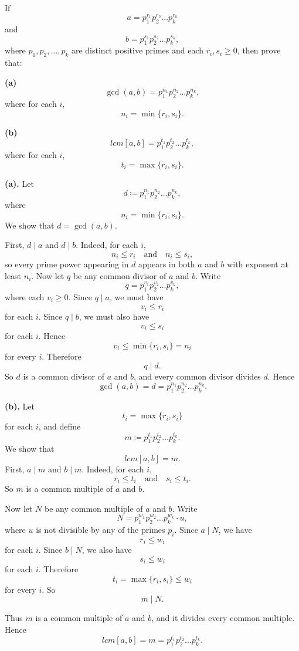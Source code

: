 \begin{problem}{
    If
    \[
        a=p_1^{r_1}p_2^{r_2}\dots p_k^{r_k}
    \]
    and
    \[
        b=p_1^{s_1}p_2^{s_2}\dots p_k^{s_k},
    \]
    where $p_1,p_2,\dots,p_k$ are distinct positive primes and each $r_i,s_i\geq 0$, then prove that:

    \textbf{(a)}
    \[
        \gcd(a,b)=p_1^{n_1}p_2^{n_2}\dots p_k^{n_k},
    \]
    where for each $i$,
    \[
        n_i=\min\{r_i,s_i\}.
    \]

    \textbf{(b)}
    \[
        lcm[a,b]=p_1^{t_1}p_2^{t_2}\dots p_k^{t_k},
    \]
    where for each $i$,
    \[
        t_i=\max\{r_i,s_i\}.
    \]
}
    \textbf{(a).}
    Let
    \[
        d\coloneqq p_1^{n_1}p_2^{n_2}\dots p_k^{n_k},
    \]
    where
    \[
        n_i=\min\{r_i,s_i\}.
    \]
    We show that $d=\gcd(a,b)$.

    First, $d\mid a$ and $d\mid b$.
    Indeed, for each $i$,
    \[
        n_i\leq r_i
        \quad\text{and}\quad
        n_i\leq s_i,
    \]
    so every prime power appearing in $d$ appears in both $a$ and $b$ with exponent at least $n_i$.
    Now let $q$ be any common divisor of $a$ and $b$.
    Write
    \[
        q=p_1^{v_1}p_2^{v_2}\dots p_k^{v_k},
    \]
    where each $v_i\geq 0$.
    Since $q\mid a$, we must have
    \[
        v_i\leq r_i
    \]
    for each $i$.
    Since $q\mid b$, we must also have
    \[
        v_i\leq s_i
    \]
    for each $i$.
    Hence
    \[
        v_i\leq \min\{r_i,s_i\}=n_i
    \]
    for every $i$.
    Therefore
    \[
        q\mid d.
    \]
    So $d$ is a common divisor of $a$ and $b$, and every common divisor divides $d$.
    Hence
    \[
        \gcd(a,b)=d=p_1^{n_1}p_2^{n_2}\dots p_k^{n_k}.
    \]

    \textbf{(b).}
    Let
    \[
        t_i=\max\{r_i,s_i\}
    \]
    for each $i$, and define
    \[
        m\coloneqq p_1^{t_1}p_2^{t_2}\dots p_k^{t_k}.
    \]
    We show that
    \[
        lcm[a,b]=m.
    \]
    First, $a\mid m$ and $b\mid m$.
    Indeed, for each $i$,
    \[
        r_i\leq t_i
        \quad\text{and}\quad
        s_i\leq t_i.
    \]
    So $m$ is a common multiple of $a$ and $b$.

    Now let $N$ be any common multiple of $a$ and $b$.
    Write
    \[
        N=p_1^{w_1}p_2^{w_2}\dots p_k^{w_k}\cdot u,
    \]
    where $u$ is not divisible by any of the primes $p_i$.
    Since $a\mid N$, we have
    \[
        r_i\leq w_i
    \]
    for each $i$.
    Since $b\mid N$, we also have
    \[
        s_i\leq w_i
    \]
    for each $i$.
    Therefore
    \[
        t_i=\max\{r_i,s_i\}\leq w_i
    \]
    for every $i$.
    So
    \[
        m\mid N.
    \]

    Thus $m$ is a common multiple of $a$ and $b$, and it divides every common multiple.
    Hence
    \[
        lcm[a,b]=m=p_1^{t_1}p_2^{t_2}\dots p_k^{t_k}.
    \]
\end{problem}

